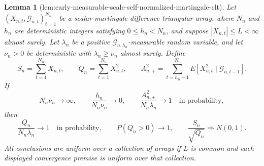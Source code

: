 \documentclass{article}
\newtheorem{lemma}{Lemma}
\begin{document}
\begin{lemma}[lem:early-measurable-scale-self-normalized-martingale-clt]\label{lem:early-measurable-scale-self-normalized-martingale-clt}
Let \((X_{n,t},\mathcal G_{n,t})_{t=1}^{N_n}\) be a scalar martingale-difference triangular array, where \(N_n\) and \(h_n\) are deterministic integers satisfying \(0\le h_n<N_n\), and suppose \(|X_{n,t}|\le L<\infty\) almost surely. Let \(\lambda_n\) be a positive \(\mathcal G_{n,h_n}\)-measurable random variable, and let \(\nu_n>0\) be deterministic with \(\lambda_n\ge\nu_n\) almost surely. Define
\[
 S_n=\sum_{t=1}^{N_n}X_{n,t},\qquad
 Q_n=\sum_{t=1}^{N_n}X_{n,t}^2,\qquad
 A_{n,+}^2=\sum_{t=h_n+1}^{N_n}E[X_{n,t}^2\mid\mathcal G_{n,t-1}].
\]
If
\[
 N_n\nu_n\longrightarrow\infty,\qquad
 \frac{h_n}{N_n\nu_n}\longrightarrow0,\qquad
 \frac{A_{n,+}^2}{N_n\lambda_n}\longrightarrow1
 \quad\text{in probability},
\]
then
\[
 \frac{Q_n}{N_n\lambda_n}\longrightarrow1
 \quad\text{in probability},\qquad
 P(Q_n>0)\longrightarrow1,\qquad
 \frac{S_n}{\sqrt{Q_n}}\Rightarrow N(0,1).
\]
All conclusions are uniform over a collection of arrays if \(L\) is common and each displayed convergence premise is uniform over that collection.
\end{lemma}
\end{document}
